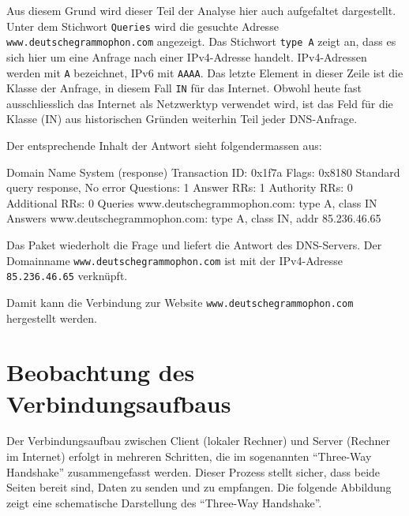 \documentclass[
  nswissgerman,
  a4paper,
  DIV=11,
  numbers=noendperiod,
  ngerman]{scrreprt}
\newenvironment{Shaded}{\begin{snugshade}}{\end{snugshade}}
\newcommand{\NormalTok}[1]{\textcolor[rgb]{0.00,0.23,0.31}{#1}}
\begin{document}
Aus diesem Grund wird dieser Teil der Analyse hier auch aufgefaltet
dargestellt.\\
Unter dem Stichwort \texttt{Queries} wird die gesuchte Adresse
\texttt{www.deutschegrammophon.com} angezeigt. Das Stichwort
\texttt{type\ A} zeigt an, dass es sich hier um eine Anfrage nach einer
IPv4-Adresse handelt. IPv4-Adressen werden mit \texttt{A} bezeichnet,
IPv6 mit \texttt{AAAA}. Das letzte Element in dieser Zeile ist die
Klasse der Anfrage, in diesem Fall \texttt{IN} für das Internet. Obwohl
heute fast ausschliesslich das Internet als Netzwerktyp verwendet wird,
ist das Feld für die Klasse (IN) aus historischen Gründen weiterhin Teil
jeder DNS-Anfrage.

Der entsprechende Inhalt der Antwort sieht folgendermassen aus:

\begin{Shaded}
\begin{Highlighting}[numbers=left,,]
\NormalTok{Domain Name System (response)}
\NormalTok{    Transaction ID: 0x1f7a}
\NormalTok{    Flags: 0x8180 Standard query response, No error}
\NormalTok{    Questions: 1}
\NormalTok{    Answer RRs: 1}
\NormalTok{    Authority RRs: 0}
\NormalTok{    Additional RRs: 0}
\NormalTok{    Queries}
\NormalTok{        www.deutschegrammophon.com: type A, class IN}
\NormalTok{    Answers}
\NormalTok{        www.deutschegrammophon.com: type A, class IN, addr 85.236.46.65}
\end{Highlighting}
\end{Shaded}

Das Paket wiederholt die Frage und liefert die Antwort des DNS-Servers.
Der Domainname \texttt{www.deutschegrammophon.com} ist mit der
IPv4-Adresse \texttt{85.236.46.65} verknüpft.

Damit kann die Verbindung zur Website
\texttt{www.deutschegrammophon.com} hergestellt werden.

\section{Beobachtung des
Verbindungsaufbaus}\label{beobachtung-des-verbindungsaufbaus}

Der Verbindungsaufbau zwischen Client (lokaler Rechner) und Server
(Rechner im Internet) erfolgt in mehreren Schritten, die im sogenannten
``Three-Way Handshake'' zusammengefasst werden. Dieser Prozess stellt
sicher, dass beide Seiten bereit sind, Daten zu senden und zu empfangen.
Die folgende Abbildung zeigt eine schematische Darstellung des
``Three-Way Handshake''.
\end{document}
